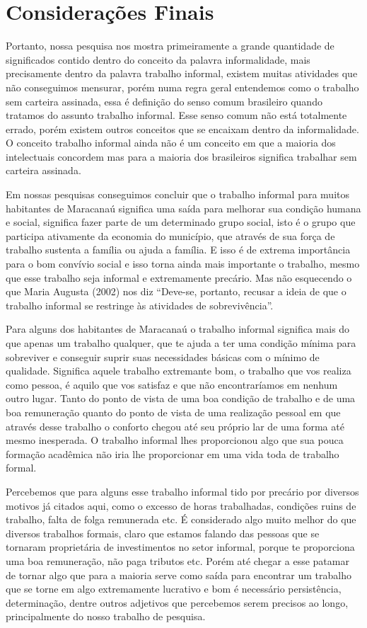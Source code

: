\chapter{Considerações Finais}

Portanto, nossa pesquisa nos mostra primeiramente a grande quantidade de 
significados contido dentro do conceito da palavra informalidade, mais 
precisamente dentro da palavra trabalho informal, existem muitas atividades que 
não conseguimos mensurar, porém numa regra geral entendemos como o trabalho sem 
carteira assinada, essa é definição do senso comum brasileiro quando tratamos do 
assunto trabalho informal. Esse senso comum não está totalmente errado, porém 
existem outros conceitos que se encaixam dentro da informalidade. O conceito 
trabalho informal ainda não é um conceito em que a maioria dos intelectuais 
concordem mas para a maioria dos brasileiros significa trabalhar sem carteira 
assinada.

Em nossas pesquisas conseguimos concluir que o trabalho informal para muitos 
habitantes de Maracanaú significa uma saída para melhorar sua condição humana e 
social, significa fazer parte de um determinado grupo social, isto é o grupo que 
participa ativamente da economia do município, que através de sua força de 
trabalho sustenta a família ou ajuda a família. E isso é de extrema importância 
para o bom convívio social e isso torna ainda mais importante o trabalho, mesmo 
que esse trabalho seja informal e extremamente precário. Mas não esquecendo o 
que Maria Augusta (2002) nos diz “Deve-se, portanto, recusar a ideia de que o 
trabalho informal se restringe às atividades de sobrevivência”. 

Para alguns dos habitantes de Maracanaú o trabalho informal significa mais do 
que apenas um trabalho qualquer, que te ajuda a ter uma condição mínima para 
sobreviver e conseguir suprir suas necessidades básicas com o mínimo de 
qualidade. Significa aquele trabalho extremante bom, o trabalho que vos realiza 
como pessoa, é aquilo que vos satisfaz e que não encontraríamos em nenhum outro 
lugar. Tanto do ponto de vista de uma boa condição de trabalho e de uma boa 
remuneração quanto do ponto de vista de uma realização pessoal em que através 
desse trabalho o conforto chegou até seu próprio lar de uma forma até mesmo 
inesperada. O trabalho informal lhes proporcionou algo que sua pouca formação 
acadêmica não iria lhe proporcionar em uma vida toda de trabalho formal.

Percebemos que para alguns esse trabalho informal tido por precário por diversos 
motivos já citados aqui, como o excesso de horas trabalhadas, condições ruins de 
trabalho, falta de folga remunerada etc. É considerado algo muito melhor do que 
diversos trabalhos formais, claro que estamos falando das pessoas que se 
tornaram proprietária de investimentos no setor informal, porque te proporciona 
uma boa remuneração, não paga tributos etc. Porém até chegar a esse patamar de 
tornar algo que para a maioria serve como saída para encontrar um trabalho que 
se torne em algo extremamente lucrativo e bom é necessário persistência, 
determinação, dentre outros adjetivos que percebemos serem precisos ao longo, 
principalmente do nosso trabalho de pesquisa. 

